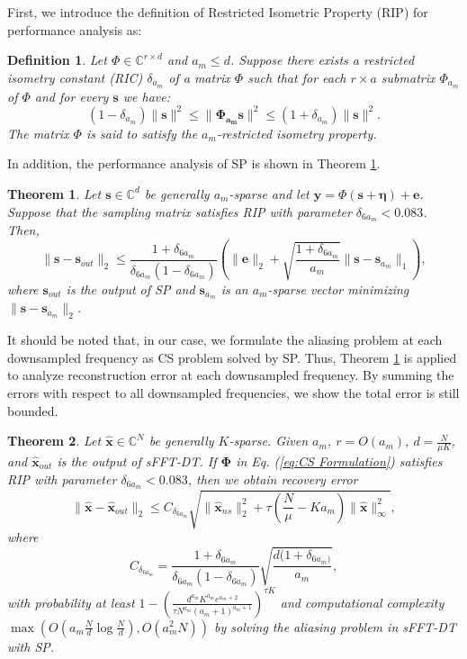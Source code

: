\documentclass[journal,onecolumn,11pt]{IEEEtran}
\newtheorem{theorem}{Theorem}
\newtheorem{definition}{Definition}
\begin{document}
First, we introduce the definition of Restricted Isometric Property (RIP) for performance analysis as:
\begin{definition}
\label{definition:RIP}
Let $\Phi \in \mathbb{C}^{r \times d}$ and $a_{m} \leq d$. Suppose there exists a restricted isometry constant (RIC) $\delta_{a_{m}}$ of a matrix $\Phi$ such that for each $r \times a$ submatrix $\Phi_{a_{m}}$ of $\Phi$ and for every $\bm{s}$ we have:
 $$ (1-\delta_{a_{m}})\| \bm{s} \|^{2} \leq \| \bm{\Phi_{a_{m}} s} \|^{2} \leq (1+\delta_{a_{m}})\| \bm{s} \|^{2}. $$
The matrix $\Phi$ is said to satisfy the $a_{m}$-restricted isometry property.
\end{definition}
In addition, the performance analysis of SP \cite{Dai2009} is shown in Theorem \ref{theorem:sp performance}.
\begin{theorem}
\label{theorem:sp performance}
Let $\bm{s} \in \mathbb{C}^{d}$ be generally $a_{m}$-sparse and let $\bm{y}=\Phi (\bm{s}+\bm{\eta})+\bm{e}$.
Suppose that the sampling matrix satisfies RIP with parameter $\delta_{6a_{m}}<0.083$.
Then,
\small
\begin{equation}
   \| \bm{s} - \bm{s}_{out} \|_2 \leq \frac{1 + \delta_{6a_{m}}}{\delta_{6a_{m}} (1 - \delta_{6a_{m}})}\left( \| \bm{e} \|_2 +\sqrt{\frac{1+\delta_{6a_{m}}}{a_{m}}}\| \bm{s} - \bm{s}_{a_{m}} \|_1 \right),
\label{Eq: SP error}
\end{equation}
\normalsize
where $\bm{s}_{out}$ is the output of SP and $\bm{s}_{a_{m}}$ is an $a_{m}$-sparse vector minimizing $\| \bm{s} - \bm{s}_{a_{m}} \|_{2}$.
\end{theorem}
It should be noted that, in our case, we formulate the aliasing problem at each downsampled frequency as CS problem solved by SP.
Thus, Theorem \ref{theorem:sp performance} is applied to analyze reconstruction error at each downsampled frequency.
By summing the errors with respect to all downsampled frequencies, we show the total error is still bounded.
\begin{theorem}
\label{theorem:sFFT performance without no pruning}
Let $\bm{\hat{x}} \in \mathbb{C}^{N}$ be generally $K$-sparse.
Given $a_{m}$, $r=O(a_{m})$, $d=\frac{N}{\mu K}$, and $\bm{\hat{x}}_{out}$ is the output of sFFT-DT.
If $\bm{\Phi}$ in Eq. (\ref{eq:CS Formulation}) satisfies RIP with parameter $\delta_{6a_{m}}<0.083$, then we obtain recovery error
$$\| \bm{\hat{x}} - \bm{\hat{x}}_{out} \|_2 \leq C_{\delta_{6a_{m}}}\sqrt{ \| \bm{\hat{x}}_{ns}\|_2^2 + \tau(   \frac{N}{\mu} -Ka_{m})\|  \bm{\hat{x}}  \|_\infty^{2} } ,$$ where
$$C_{\delta_{6a_{m}}} = \frac{1 + \delta_{6a_{m}}}{\delta_{6a_{m}}
(1 -\delta_{6a_{m}})}\sqrt{\frac{d(1+\delta_{6a_{m})}}{a_{m}}},$$
with probability at least $1-\left(\frac{d^{a_{m}}K^{a_{m}}  e^{a_{m}+2}}{\tau N^{a_{m}} (a_{m}+1)^{a_{m}+1}}\right)^{\tau K} $ and computational complexity $\max \left( O(a_{m}\frac{N}{d} \log \frac{N}{d} ), O(a_{m}^2 N) \right)$ by solving the aliasing problem in sFFT-DT with SP.
\end{theorem}
\end{document}
